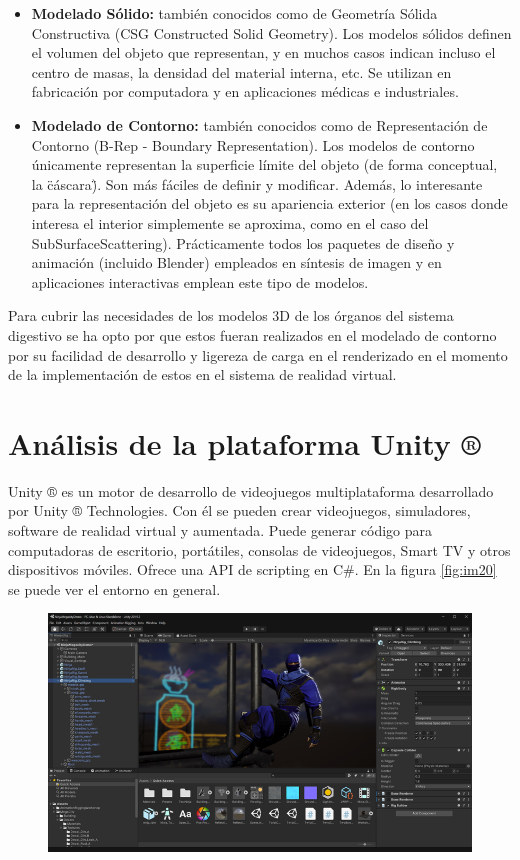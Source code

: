 \begin{itemize}
\item \textbf{Modelado Sólido:} también conocidos como de Geometría Sólida Constructiva (CSG Constructed Solid Geometry). Los modelos sólidos definen el volumen 
del objeto que representan, y en muchos casos indican incluso el centro de masas, la densidad del material interna, etc. Se utilizan en fabricación por computadora 
y en aplicaciones médicas e industriales.
\item \textbf{Modelado de Contorno:} también conocidos como de Representación de Contorno (B-Rep - Boundary Representation). Los modelos de contorno únicamente 
representan la superficie límite del objeto (de forma conceptual, la \"cáscara\"). Son más fáciles de definir y modificar. Además, lo interesante para la representación 
del objeto es su apariencia exterior (en los casos donde interesa el interior simplemente se aproxima, como en el caso del SubSurfaceScattering). Prácticamente todos 
los paquetes de diseño y animación (incluido Blender) empleados en síntesis de imagen y en aplicaciones interactivas emplean este tipo de modelos.
\end{itemize}
Para  cubrir las necesidades de los modelos 3D de los órganos del sistema digestivo se ha opto por que estos fueran realizados en el 
modelado de contorno por su facilidad de desarrollo y ligereza de carga en el renderizado en el momento de la implementación de estos 
en el sistema de realidad virtual.\\

\section{Análisis de la plataforma Unity ®}
Unity ® es un motor de desarrollo de videojuegos multiplataforma desarrollado por Unity ® Technologies. Con él se pueden crear videojuegos, simuladores, 
software de realidad virtual y aumentada. Puede generar código para computadoras de escritorio, portátiles, consolas de videojuegos, Smart TV y otros dispositivos móviles. 
Ofrece una API de scripting en C\#. En la figura \ref{fig:im20} se puede ver el entorno en general.\\
\begin{figure}[H]
	\begin{center}
 		\includegraphics[width = .5\textwidth]{source/images/image33.png}
	\end{center} 
\end{figure}
